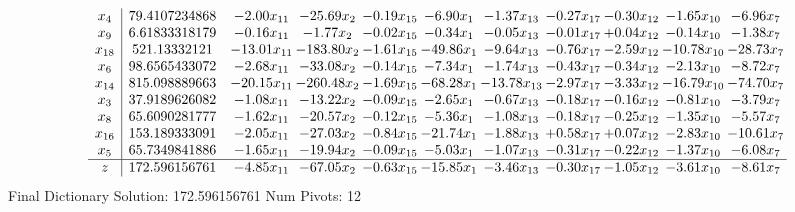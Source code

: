 \documentclass[9pt]{article}
\begin{document}
 \[\begin{array}{c| c c@{\hskip 2pt} c@{\hskip 2pt} c@{\hskip 2pt} c@{\hskip 2pt} c@{\hskip 2pt} c@{\hskip 2pt} c@{\hskip 2pt} c@{\hskip 2pt} c@{\hskip 2pt} }
 x_{4}   &  79.4107234868 & -2.00 x_{11} & -25.69 x_{2} & -0.19 x_{15} & -6.90 x_{1} & -1.37 x_{13} & -0.27 x_{17} & -0.30 x_{12} & -1.65 x_{10} & -6.96 x_{7}\\
 x_{9}   &  6.61833318179 & -0.16 x_{11} & -1.77 x_{2} & -0.02 x_{15} & -0.34 x_{1} & -0.05 x_{13} & -0.01 x_{17} & +  0.04 x_{12} & -0.14 x_{10} & -1.38 x_{7}\\
 x_{18}   &  521.13332121 & -13.01 x_{11} & -183.80 x_{2} & -1.61 x_{15} & -49.86 x_{1} & -9.64 x_{13} & -0.76 x_{17} & -2.59 x_{12} & -10.78 x_{10} & -28.73 x_{7}\\
 x_{6}   &  98.6565433072 & -2.68 x_{11} & -33.08 x_{2} & -0.14 x_{15} & -7.34 x_{1} & -1.74 x_{13} & -0.43 x_{17} & -0.34 x_{12} & -2.13 x_{10} & -8.72 x_{7}\\
 x_{14}   &  815.098889663 & -20.15 x_{11} & -260.48 x_{2} & -1.69 x_{15} & -68.28 x_{1} & -13.78 x_{13} & -2.97 x_{17} & -3.33 x_{12} & -16.79 x_{10} & -74.70 x_{7}\\
 x_{3}   &  37.9189626082 & -1.08 x_{11} & -13.22 x_{2} & -0.09 x_{15} & -2.65 x_{1} & -0.67 x_{13} & -0.18 x_{17} & -0.16 x_{12} & -0.81 x_{10} & -3.79 x_{7}\\
 x_{8}   &  65.6090281777 & -1.62 x_{11} & -20.57 x_{2} & -0.12 x_{15} & -5.36 x_{1} & -1.08 x_{13} & -0.18 x_{17} & -0.25 x_{12} & -1.35 x_{10} & -5.57 x_{7}\\
 x_{16}   &  153.189333091 & -2.05 x_{11} & -27.03 x_{2} & -0.84 x_{15} & -21.74 x_{1} & -1.88 x_{13} & +  0.58 x_{17} & +  0.07 x_{12} & -2.83 x_{10} & -10.61 x_{7}\\
 x_{5}   &  65.7349841886 & -1.65 x_{11} & -19.94 x_{2} & -0.09 x_{15} & -5.03 x_{1} & -1.07 x_{13} & -0.31 x_{17} & -0.22 x_{12} & -1.37 x_{10} & -6.08 x_{7}\\
\hline
z    &  172.596156761 & -4.85 x_{11} & -67.05 x_{2} & -0.63 x_{15} & -15.85 x_{1} & -3.46 x_{13} & -0.30 x_{17} & -1.05 x_{12} & -3.61 x_{10} & -8.61 x_{7}\\
\end{array}\]
Final Dictionary
Solution:  172.596156761
Num Pivots:  12
\end{document}
